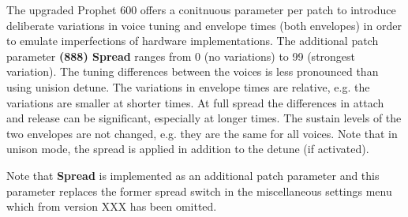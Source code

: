 The upgraded Prophet 600 offers a conitnuous parameter per patch to introduce deliberate variations in voice tuning and envelope times (both envelopes) in  order to emulate imperfections of hardware implementations. The additional patch parameter \textbf{(888) Spread} ranges from 0 (no variations) to 99 (strongest variation). The tuning differences between the voices is less pronounced than using unision detune. The variations in envelope times are relative, e.g. the variations are smaller at shorter times. At full spread the differences in attach and release can be significant, especially at longer times. The sustain levels of the two envelopes are not changed, e.g. they are the same for all voices. Note that in unison mode, the spread is applied in addition to the detune (if activated). 

Note that \textbf{Spread} is implemented as an additional patch parameter and this parameter replaces the former spread switch in the miscellaneous settings menu which from version XXX has been omitted.
